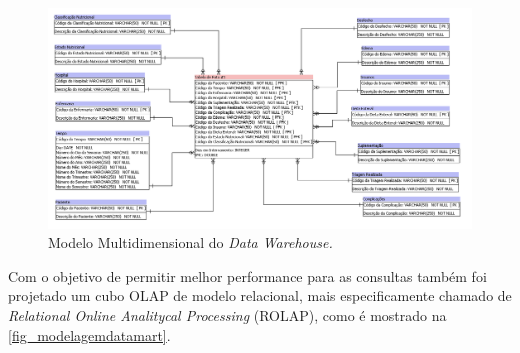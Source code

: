 \begin{figure}[htb]
	\caption{\label{fig_modelagemdatawarehouse}Modelo Multidimensional do \textit{Data Warehouse.}}
	\begin{center}
	    \includegraphics[scale=0.53]{Imagens/figura - modelagem multidimensional datawarehouse.png}
	\end{center}
\end{figure}

\newpage
Com o objetivo de permitir melhor performance para as consultas também foi projetado um cubo OLAP de modelo relacional, mais especificamente chamado de \textit{Relational Online Analitycal Processing} (ROLAP), como é mostrado na \autoref{fig_modelagemdatamart}.

